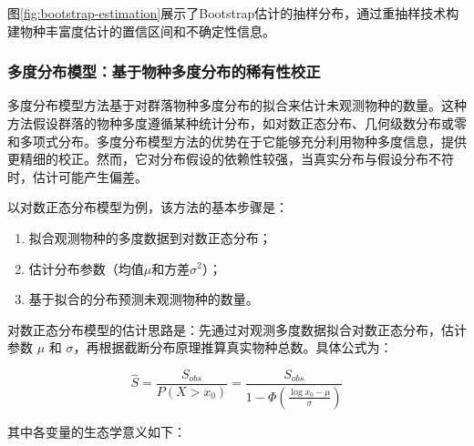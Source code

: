 \documentclass[
  twoside,12pt,fontset=none]{ctexbook}
\providecommand{\tightlist}{%
  \setlength{\itemsep}{0pt}\setlength{\parskip}{0pt}}
\begin{document}
图\ref{fig:bootstrap-estimation}展示了Bootstrap估计的抽样分布，通过重抽样技术构建物种丰富度估计的置信区间和不确定性信息。

\hypertarget{ux591aux5ea6ux5206ux5e03ux6a21ux578bux57faux4e8eux7269ux79cdux591aux5ea6ux5206ux5e03ux7684ux7a00ux6709ux6027ux6821ux6b63}{%
\subsubsection{多度分布模型：基于物种多度分布的稀有性校正}\label{ux591aux5ea6ux5206ux5e03ux6a21ux578bux57faux4e8eux7269ux79cdux591aux5ea6ux5206ux5e03ux7684ux7a00ux6709ux6027ux6821ux6b63}}

多度分布模型方法基于对群落物种多度分布的拟合来估计未观测物种的数量。这种方法假设群落的物种多度遵循某种统计分布，如对数正态分布、几何级数分布或零和多项式分布。多度分布模型方法的优势在于它能够充分利用物种多度信息，提供更精细的校正。然而，它对分布假设的依赖性较强，当真实分布与假设分布不符时，估计可能产生偏差。

以对数正态分布模型为例，该方法的基本步骤是：

\begin{enumerate}
\def\labelenumi{\arabic{enumi}.}
\tightlist
\item
  拟合观测物种的多度数据到对数正态分布；
\item
  估计分布参数（均值\(\mu\)和方差\(\sigma^2\)）；
\item
  基于拟合的分布预测未观测物种的数量。
\end{enumerate}

对数正态分布模型的估计思路是：先通过对观测多度数据拟合对数正态分布，估计参数 \(\mu\) 和 \(\sigma\)，再根据截断分布原理推算真实物种总数。具体公式为：

\[\hat{S} = \frac{S_{obs}}{P(X > x_0)} = \frac{S_{obs}}{1 - \Phi\left(\frac{\log x_0 - \mu}{\sigma}\right)}\]

其中各变量的生态学意义如下：
\end{document}
